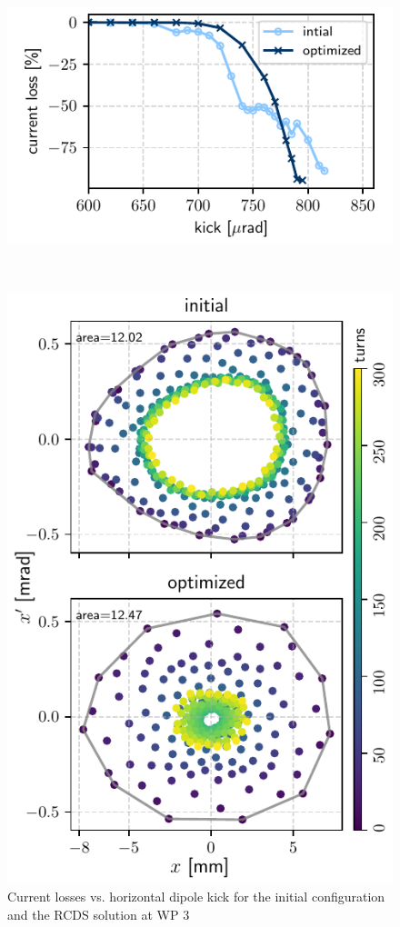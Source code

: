 \begin{figure}[htb]
    \begin{minipage}{0.48\textwidth}
        \centering
        \includegraphics[width=\textwidth]{Images/wp3_kick_resilience.pdf}
        \caption{Current losses vs. horizontal dipole kick for the initial configuration and the RCDS solution at WP 3}
    \end{minipage}\
    \hfill
    \begin{minipage}{0.48\textwidth}
        \centering
        \includegraphics[width=\textwidth]{Images/wp3_phase_space.pdf}

\end{minipage}
\end{figure}
